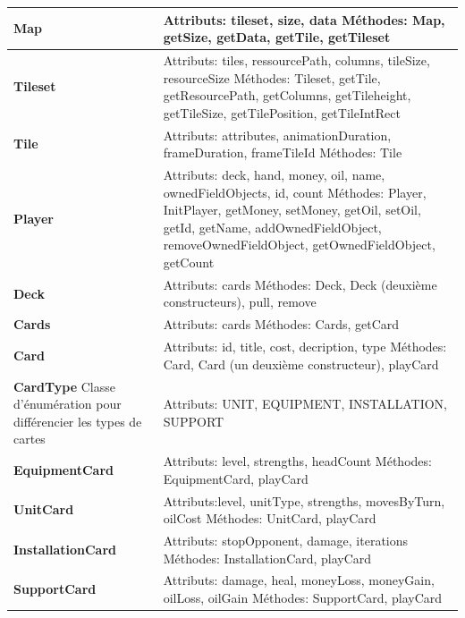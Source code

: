 


\begin{tabularx}{15 cm}{|X|X|}
\hline
\textbf{Map} & Attributs: tileset, size, data  \newline Méthodes: Map, getSize, getData, getTile, getTileset\\
\hline
\textbf{Tileset} & Attributs: tiles, ressourcePath, columns, tileSize, resourceSize  \newline Méthodes: Tileset, getTile, getResourcePath, getColumns, getTileheight, getTileSize, getTilePosition, getTileIntRect\\
\hline
\textbf{Tile} & Attributs: attributes, animationDuration, frameDuration, frameTileId  \newline Méthodes: Tile\\
\hline
\textbf{Player} & Attributs: deck, hand, money, oil, name, ownedFieldObjects, id, count  \newline Méthodes: Player, InitPlayer,  getMoney, setMoney, getOil, setOil, getId, getName, addOwnedFieldObject, removeOwnedFieldObject, getOwnedFieldObject, getCount\\
\hline
\textbf{Deck} & Attributs: cards  \newline Méthodes: Deck, Deck (deuxième constructeurs), pull, remove\\
\hline
\textbf{Cards} & Attributs: cards  \newline Méthodes: Cards, getCard\\
\hline
\textbf{Card} & Attributs: id, title, cost, decription, type  \newline Méthodes: Card, Card (un deuxième constructeur), playCard\\
\hline
\textbf{CardType} \newline Classe d'énumération pour différencier les types de cartes & Attributs: UNIT, EQUIPMENT, INSTALLATION, SUPPORT  \newline \\
\hline
\textbf{EquipmentCard} & Attributs: level, strengths, headCount  \newline Méthodes: EquipmentCard, playCard\\
\hline
\textbf{UnitCard} & Attributs:level, unitType, strengths, movesByTurn, oilCost  \newline Méthodes: UnitCard, playCard\\
\hline
\textbf{InstallationCard} & Attributs: stopOpponent, damage, iterations \newline Méthodes: InstallationCard, playCard\\
\hline
\textbf{SupportCard} & Attributs: damage, heal, moneyLoss, moneyGain, oilLoss, oilGain  \newline Méthodes: SupportCard, playCard\\
\hline
\end{tabularx}

